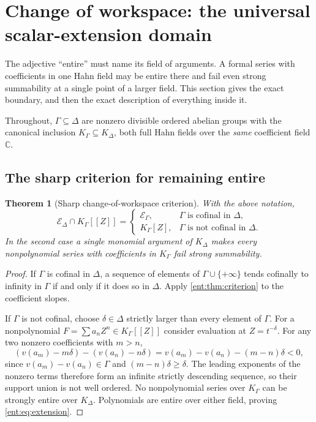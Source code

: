 \documentclass[11pt]{article}
\newtheorem{theorem}{Theorem}[section]
\theoremstyle{plain}
\theoremstyle{plain}
\theoremstyle{plain}
\theoremstyle{definition}
\theoremstyle{definition}
\theoremstyle{definition}
\theoremstyle{definition}
\theoremstyle{remark}
\newcommand{\C}{\mathbb C}\newcommand{\R}{\mathbb R}
\newcommand{\K}{K_\Gamma}\newcommand{\KD}{K_\Delta}
\newcommand{\E}{\mathcal E_\Gamma}
\begin{document}
\section{Change of workspace: the universal scalar-extension domain}
\label{ent:sec:extension}

The adjective ``entire'' must name its field of arguments. A formal series
with coefficients in one Hahn field may be entire there and fail even strong
summability at a single point of a larger field. This section gives the exact
boundary, and then the exact description of everything inside it.

Throughout, $\Gamma\subseteq\Delta$ are nonzero divisible ordered abelian
groups with the canonical inclusion $\K\subseteq\KD$, both full Hahn fields
over the \emph{same} coefficient field $\C$.

\subsection{The sharp criterion for remaining entire}
\begin{theorem}[Sharp change-of-workspace criterion]
\label{ent:thm:extension-criterion}
With the above notation,
\begin{equation}\label{ent:eq:extension}
 \mathcal E_\Delta\cap\K[[Z]]=
 \begin{cases}
   \E,&\Gamma\text{ is cofinal in }\Delta,\\
   \K[Z],&\Gamma\text{ is not cofinal in }\Delta.
 \end{cases}
\end{equation}
In the second case a single monomial argument of $\KD$ makes \emph{every}
nonpolynomial series with coefficients in $\K$ fail strong summability.
\end{theorem}
\begin{proof}
If $\Gamma$ is cofinal in $\Delta$, a sequence of elements of
$\Gamma\cup\{+\infty\}$ tends cofinally to infinity in $\Gamma$ if and only
if it does so in $\Delta$. Apply \cref{ent:thm:criterion} to the coefficient
slopes.

If $\Gamma$ is not cofinal, choose $\delta\in\Delta$ strictly larger than
every element of $\Gamma$. For a nonpolynomial $F=\sum a_nZ^n\in\K[[Z]]$
consider evaluation at $Z=t^{-\delta}$. For any two nonzero coefficients with
$m>n$,
\[
 (v(a_m)-m\delta)-(v(a_n)-n\delta)
       =v(a_m)-v(a_n)-(m-n)\delta<0,
\]
since $v(a_m)-v(a_n)\in\Gamma$ and $(m-n)\delta\ge\delta$. The leading
exponents of the nonzero terms therefore form an infinite strictly descending
sequence, so their support union is not well ordered. No nonpolynomial series
over $\K$ can be strongly entire over $\KD$. Polynomials are entire over
either field, proving \eqref{ent:eq:extension}.
\end{proof}
\end{document}
